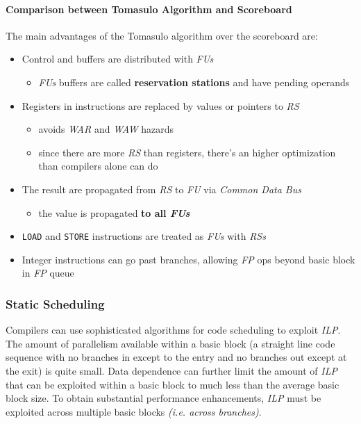 \documentclass[english]{article}
\begin{document}
\paragraph{Comparison between Tomasulo Algorithm and Scoreboard}

The main advantages of the Tomasulo algorithm over the scoreboard are:
\begin{itemize}
  \item Control and buffers are distributed with \textit{FUs}
        \begin{itemize}
          \item \textit{FUs} buffers are called \textbf{reservation stations} and have pending operands
        \end{itemize}
  \item Registers in instructions are replaced by values or pointers to \textit{RS}
        \begin{itemize}
          \item avoids \textit{WAR} and \textit{WAW} hazards
          \item since there are more \textit{RS} than registers, there's an higher optimization than compilers alone can do
        \end{itemize}
  \item The result are propagated from \textit{RS} to \textit{FU} via \textit{Common Data Bus}
        \begin{itemize}
          \item the value is propagated \textbf{to all \textit{FUs}}
        \end{itemize}
  \item \texttt{LOAD} and \texttt{STORE} instructions are treated as \textit{FUs} with \textit{RSs}
  \item Integer instructions can go past branches, allowing \textit{FP} ops beyond basic block in \textit{FP} queue
\end{itemize}

\subsubsection{Static Scheduling}

Compilers can use sophisticated algorithms for code scheduling to exploit \textit{ILP}.
The amount of parallelism available within a basic block (a straight line code sequence with no branches in except to the entry and no branches out except at the exit) is quite small.
Data dependence can further limit the amount of \textit{ILP} that can be exploited within a basic block to much less than the average basic block size.
To obtain substantial performance enhancements, \textit{ILP} must be exploited across multiple basic blocks \textit{(i.e. across branches)}.
\end{document}
